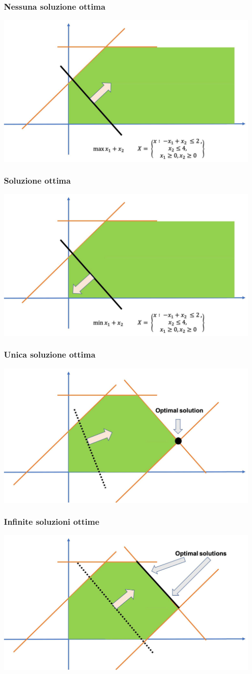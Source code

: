 \documentclass[12pt,a4paper]{article}
\begin{document}
\subsubsection{Nessuna soluzione ottima}
\begin{center}
\includegraphics[width=0.4\columnwidth]{img/no_sol.jpg}
\end{center}
\subsubsection{Soluzione ottima}
\begin{center}
\includegraphics[width=0.4\columnwidth]{img/opt_sol.jpg}
\end{center}
\subsubsection{Unica soluzione ottima}
\begin{center}
\includegraphics[width=0.4\columnwidth]{img/one_opt_sol.jpg}
\end{center}
\subsubsection{Infinite soluzioni ottime}
\begin{center}
\includegraphics[width=0.4\columnwidth]{img/inf_opt_sol.jpg}
\end{center}
\end{document}
